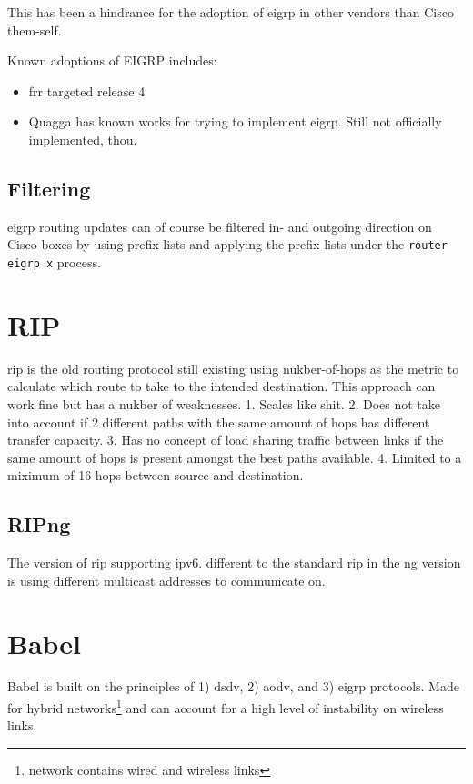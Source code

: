 This has been a hindrance for the adoption of \gls{eigrp} in other vendors than Cisco them-self.

Known adoptions of EIGRP includes:
\begin{itemize}
    \item \gls{frr} targeted release 4\cite{Frr30-4047:online}
    \item Quagga has known works for trying to implement \gls{eigrp}. Still not officially implemented, thou.
\end{itemize}

\subsection{Filtering}

\gls{eigrp} routing updates can of course be filtered in- and outgoing direction on Cisco boxes by using prefix-lists and applying the prefix lists under the \texttt{router eigrp x} process.

\newpage

\section{RIP}

rip is the old routing protocol still existing using nukber-of-hops as the metric to calculate which route to take to the intended destination. This approach can work fine but has a nukber of weaknesses.
1. Scales like shit.
2. Does not take into account if 2 different paths with the same amount of hops has different transfer capacity.
3. Has no concept of load sharing traffic between links if the same amount of hops is present amongst the best paths available.
4. Limited to a miximum of 16 hops between source and destination.

\newpage

\subsection{RIPng}

The version of rip supporting ipv6. different to the standard rip in the ng version is using different multicast addresses to communicate on.

\newpage

\section{Babel}

Babel is built on the principles of 1) \gls{dsdv}, 2) \gls{aodv}, and 3) 
\gls{eigrp} protocols.
Made for hybrid networks\footnote{network contains wired and wireless links} 
and can account for a high level of instability on wireless links.

